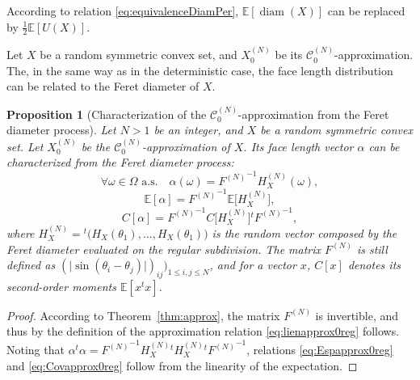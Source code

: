 \documentclass[numbers,compress,v1.0.1]{vmsta}
\newtheorem{proposition}{Proposition}
\theoremstyle{definition}
\begin{document}
According to relation \eqref{eq:equivalenceDiamPer}, $\mathbb
{E}[\operatorname{diam}(X)]$ can be replaced by $\frac{1}{2}\mathbb{E}[U(X)]$.

Let $X$ be a random symmetric convex set, and $X_0^{(N)}$ be its
$\mathcal{C}^{(N)}_0$-approximation. The, in the same way as in the
deterministic case, the face length distribution can be related to the
Feret diameter of $X$.

\begin{proposition}[Characterization of the $\mathcal
{C}^{(N)}_0$-approximation from the Feret diameter process]
Let $N>1$ be an integer, and $X$ be a random symmetric convex set. Let
$X_0^{(N)}$ be the $\mathcal{C}^{(N)}_0$-approximation of $X$. Its face
length vector $\alpha$ can be characterized from the Feret diameter process:
%
\begin{equation}
\forall\omega\in\varOmega\text{ a.s.}\quad\alpha(\omega)={F^{(N)}}^{-1}
H_X^{(N)}(\omega), \label{eq:lienapprox0reg}
\end{equation}
%
\begin{equation}
\mathbb{E}[\alpha]={F^{(N)}}^{-1}\mathbb{E}
\bigl[H_X^{(N)}\bigr], \label{eq:Espapprox0reg}
\end{equation}
%
\begin{equation}
C[\alpha]={F^{(N)}}^{-1}C\bigl[H_X^{(N)}
\bigr]{^t{F^{(N)}}^{-1}}, \label{eq:Covapprox0reg}
\end{equation}
%
where $ H_X^{(N)}= {^t(}H_X(\theta_1),\dots,H_X(\theta_1))$ is the
random vector composed by the Feret diameter evaluated on the regular
subdivision. The matrix $F^{(N)}$ is still defined as $(\vert\sin
(\theta_i-\theta_j)\vert)_{ij})_{1\leq i,j\leq N}$, and for a vector
$x$, $C[x]$ denotes its second-order moments $\mathbb{E}[x {^tx}]$.
\end{proposition}

\begin{proof}
According to Theorem~\ref{thm:approx}, the matrix $F^{(N)}$ is
invertible, and thus by the definition of the approximation relation
\eqref{eq:lienapprox0reg} follows. Noting that $\alpha{^t\alpha
}={F^{(N)}}^{-1}H_X^{(N)}{^t{H_X^{(N)}}} {^t{F^{(N)}}^{-1}}$, relations
\eqref{eq:Espapprox0reg} and \eqref{eq:Covapprox0reg} follow from the
linearity of the expectation.
\end{proof}
\end{document}
